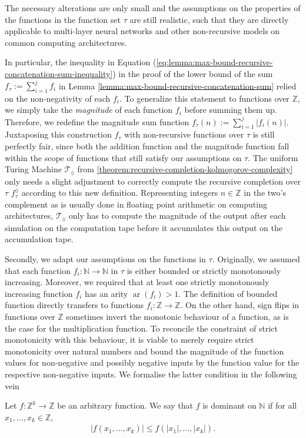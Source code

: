 The necessary alterations are only small and the assumptions on the properties of the functions in the function set $\tau$ are still realistic, such that they are directly applicable to multi-layer neural networks and other non-recursive models on common computing architectures.

In particular, the inequality in Equation (\ref{eq:lemma:max-bound-recursive-concatenation-sum-inequality}) in the proof of the lower bound of the sum $f_\tau:=\sum_{i=1}^{j}f_i$ in Lemma \ref{lemma:max-bound-recursive-concatenation-sum} relied on the non-negativity of each $f_i$.
To generalize this statement to functions over $\mathbb{Z}$, we simply take the \textit{magnitude} of each function $f_i$ before summing them up.
Therefore, we redefine the magnitude sum function $f_\tau(n):=\sum_{i=1}^{j}|f_i(n)|$.
Juxtaposing this construction $f_{\tau}$ with non-recursive functions over $\tau$ is still perfectly fair, since both the addition function and the magnitude function fall within the scope of functions that still satisfy our assumptions on $\tau$.
The uniform Turing Machine $\mathcal{T}_{\lozenge}$ from \ref{theorem:recursive-completion-kolmogorov-complexity} only needs a slight adjustment to correctly compute the recursive completion over $\tau$ $f_\tau^{\lozenge}$ according to this new definition.
Representing integers $n\in\mathbb{Z}$ in the two's complement as is usually done in floating point arithmetic on computing architectures, $\mathcal{T}_{\lozenge}$ only has to compute the magnitude of the output after each simulation on the computation tape before it accumulates this output on the accumulation tape.

Secondly, we adapt our assumptions on the functions in $\tau$.
Originally, we assumed that each function $f_i:\mathbb{N}\to\mathbb{N}$ in $\tau$ is either bounded or strictly monotonously increasing. Moreover, we required that at least one strictly monotonously increasing function $f_i$ has an arity $\operatorname{ar}(f_i)>1$.
The definition of bounded function directly transfers to functions $f_i:\mathbb{Z}\to\mathbb{Z}$.
On the other hand, sign flips in functions over $\mathbb{Z}$ sometimes invert the monotonic behaviour of a function, as is the case for the multiplication function.
To reconcile the constraint of strict monotonicity with this behaviour, it is viable to merely require strict monotonicity over natural numbers and bound the magnitude of the function values for non-negative and possibly negative inputs by the function value for the respective non-negative inputs. 
We formalise the latter condition in the following vein
\begin{definition}
	\label{def:dominance-on-n}
	Let $f:\mathbb{Z}^{k}\to\mathbb{Z}$ be an arbitrary function.
	We say that $f$ is dominant on $\mathbb{N}$ if for all $x_1,\dots,x_k\in\mathbb{Z}$,
	\begin{align}
		|f(x_1,\dots,x_k)|\leq f(|x_1|,\dots,|x_k|).
	\end{align}
\end{definition}

